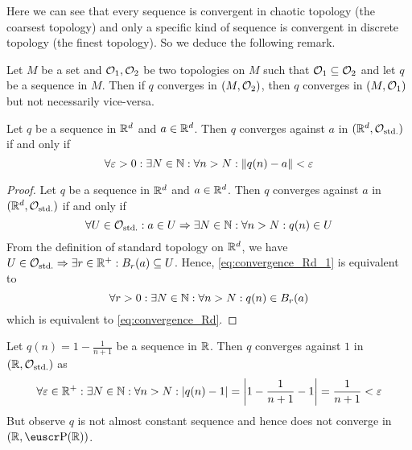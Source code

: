 Here we can see that every sequence is convergent in chaotic topology (the coarsest topology) and only a specific kind of sequence is convergent in discrete topology (the finest topology). So we deduce the following remark.

\begin{remark}\label{rem:convergence_in_comparison_topologies}
	Let \(M\) be a set and \(\mathcal{O}_1, \mathcal{O}_2\) be two topologies on \(M\) such that \(\mathcal{O}_1 \subseteq \mathcal{O}_2\) and let \(q\) be a sequence in \(M\). Then if \(q\) converges in \((M, \mathcal{O}_2)\), then \(q\) converges in \((M, \mathcal{O}_1)\) but not necessarily vice-versa.
\end{remark}

\begin{theorem}
	Let \(q\) be a sequence in \(\mathbb R^d\) and \(a \in \mathbb R^d\). Then \(q\) converges against \(a\) in \((\mathbb R^d, \mathcal{O}_{\text{std.}})\) if and only if
	\begin{equation}
		\forall \varepsilon > 0: \exists N \in \mathbb N: \forall n > N: \norm{q(n) - a} < \varepsilon \label{eq:convergence_Rd}
	\end{equation}
\end{theorem}

\begin{proof}
	Let \(q\) be a sequence in \(\mathbb R^d\) and \(a \in \mathbb R^d\). Then \(q\) converges against \(a\) in \((\mathbb R^d, \mathcal{O}_{\text{std.}})\) if and only if
	\begin{equation}
		\forall U \in \mathcal{O}_{\text{std.}}: a \in U \Rightarrow \exists N \in \mathbb N: \forall n > N: q(n) \in U \label{eq:convergence_Rd_1}
	\end{equation}
	From the definition of standard topology on \(\mathbb R^d\), we have \(U \in \mathcal{O}_{\text{std.}} \Rightarrow \exists r \in \mathbb R^+: B_r(a) \subseteq U\). Hence, \eqref{eq:convergence_Rd_1} is equivalent to
	\begin{equation}
		\forall r > 0: \exists N \in \mathbb N: \forall n > N: q(n) \in B_r(a) \label{eq:convergence_Rd_2}
	\end{equation}
	which is equivalent to \eqref{eq:convergence_Rd}.
\end{proof}

\begin{example}[Convergence in \(\R\)]
	Let \(q(n) = 1 - \frac{1}{n + 1}\) be a sequence in \(\R\). Then \(q\) converges against \(1\) in \((\mathbb R, \mathcal{O}_{\text{std.}})\) as
	\begin{equation*}
		\forall \varepsilon \in \mathbb R^+: \exists N \in \mathbb N: \forall n > N: \abs{q(n) - 1} = \abs{1 - \frac{1}{n + 1} - 1} = \frac{1}{n + 1} < \varepsilon
	\end{equation*}
	But observe \(q\) is not almost constant sequence and hence does not converge in \((\R, \powerset(\R))\).
\end{example}


